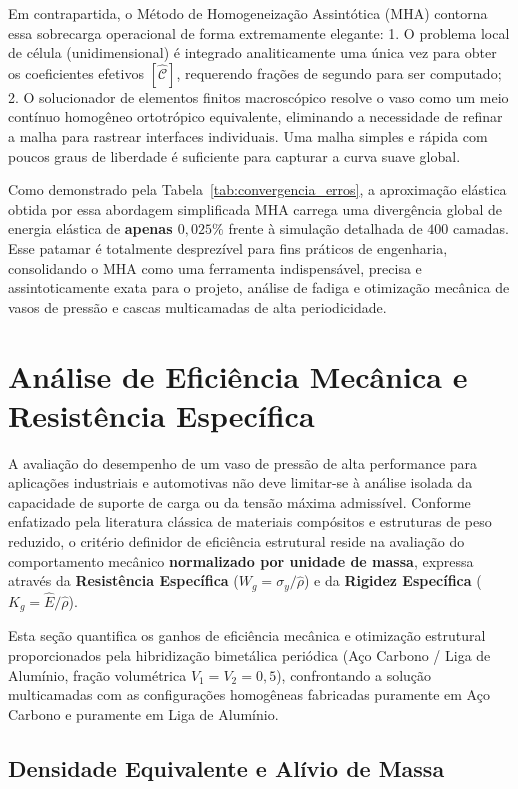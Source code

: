 Em contrapartida, o Método de Homogeneização Assintótica (MHA) contorna essa sobrecarga operacional de forma extremamente elegante:
1. O problema local de célula (unidimensional) é integrado analiticamente uma única vez para obter os coeficientes efetivos $[\hat{\mathcal{C}}]$, requerendo frações de segundo para ser computado;
2. O solucionador de elementos finitos macroscópico resolve o vaso como um meio contínuo homogêneo ortotrópico equivalente, eliminando a necessidade de refinar a malha para rastrear interfaces individuais. Uma malha simples e rápida com poucos graus de liberdade é suficiente para capturar a curva suave global.

Como demonstrado pela Tabela~\ref{tab:convergencia_erros}, a aproximação elástica obtida por essa abordagem simplificada MHA carrega uma divergência global de energia elástica de \textbf{apenas $0,025\%$} frente à simulação detalhada de $400$ camadas. Esse patamar é totalmente desprezível para fins práticos de engenharia, consolidando o MHA como uma ferramenta indispensável, precisa e assintoticamente exata para o projeto, análise de fadiga e otimização mecânica de vasos de pressão e cascas multicamadas de alta periodicidade.

\section{Análise de Eficiência Mecânica e Resistência Específica}\label{sec:eficiencia_mecanica}

A avaliação do desempenho de um vaso de pressão de alta performance para aplicações industriais e automotivas não deve limitar-se à análise isolada da capacidade de suporte de carga ou da tensão máxima admissível. Conforme enfatizado pela literatura clássica de materiais compósitos e estruturas de peso reduzido, o critério definidor de eficiência estrutural reside na avaliação do comportamento mecânico \textbf{normalizado por unidade de massa}, expressa através da \textbf{Resistência Específica} ($W_g = \sigma_y / \hat{\rho}$) e da \textbf{Rigidez Específica} ($K_g = \hat{E} / \hat{\rho}$).

Esta seção quantifica os ganhos de eficiência mecânica e otimização estrutural proporcionados pela hibridização bimetálica periódica (Aço Carbono / Liga de Alumínio, fração volumétrica $V_1 = V_2 = 0,5$), confrontando a solução multicamadas com as configurações homogêneas fabricadas puramente em Aço Carbono e puramente em Liga de Alumínio.

\subsection{Densidade Equivalente e Alívio de Massa}

